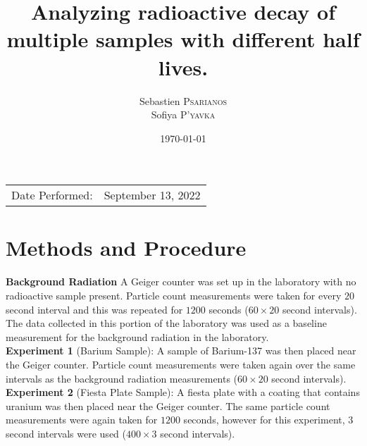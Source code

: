 \documentclass[
	letterpaper, %
	10pt, %
]{CSUniSchoolLabReport}
\title{Analyzing radioactive decay of multiple samples with different half lives.}
\author{Sebastien \textsc{Psarianos}\\ Sofiya \textsc{P'yavka}}
\date{\today}
\begin{document}
\maketitle

\begin{center}
	\begin{tabular}{l r}
		Date Performed: & September 13, 2022 \\
	\end{tabular}
\end{center}

\section{Methods and Procedure}
\textbf{Background Radiation} A Geiger counter was set up in the laboratory with no radioactive sample present. Particle count measurements were taken for every $20$ second interval and this was repeated for $1200$ seconds ($60\times20$ second intervals). The data collected in this portion of the laboratory was used as a baseline measurement for the background radiation in the laboratory.\\

\textbf{Experiment 1} (Barium Sample): A sample of Barium-137 was then placed near the Geiger counter. Particle count measurements were taken again over the same intervals as the background radiation measurements ($60\times20$ second intervals).\\

\textbf{Experiment 2} (Fiesta Plate Sample): A fiesta plate with a coating that contains uranium was then placed near the Geiger counter. The same particle count measurements were again taken for $1200$ seconds, however for this experiment, $3$ second intervals were used ($400\times3$ second intervals).
\end{document}
